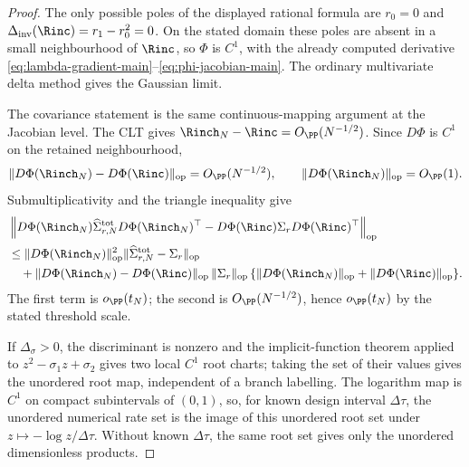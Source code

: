 \begin{proof}
The only possible poles of the displayed rational formula are \(r_0=0\) and
\(\Delta_{\mathrm{inv}}(\Rinc)=r_1-r_0^2=0\).  On the stated domain these poles are absent in a small
neighbourhood of \(\Rinc\), so \(\Phi\) is \(C^1\), with the already computed
derivative \eqref{eq:lambda-gradient-main}--\eqref{eq:phi-jacobian-main}.  The
ordinary multivariate delta method gives the Gaussian limit.

The covariance statement is the same continuous-mapping argument at the
Jacobian level.  The CLT gives \(\Rinch_N-\Rinc=O_{\PP}(N^{-1/2})\).  Since
\(D\Phi\) is \(C^1\) on the retained neighbourhood,
\[
\|D\Phi(\Rinch_N)-D\Phi(\Rinc)\|_{\operatorname{op}}=O_{\PP}(N^{-1/2}),
\qquad
\|D\Phi(\Rinch_N)\|_{\operatorname{op}}=O_{\PP}(1).
\]
Submultiplicativity and the triangle inequality give
\[
\begin{aligned}
&\left\|
D\Phi(\Rinch_N)\widehat\Sigma_{r,N}^{\rm tot}D\Phi(\Rinch_N)^\top
-D\Phi(\Rinc)\Sigma_rD\Phi(\Rinc)^\top
\right\|_{\operatorname{op}}\\
&\le
\|D\Phi(\Rinch_N)\|_{\operatorname{op}}^2
\|\widehat\Sigma_{r,N}^{\rm tot}-\Sigma_r\|_{\operatorname{op}}\\
&\quad+
\|D\Phi(\Rinch_N)-D\Phi(\Rinc)\|_{\operatorname{op}}\,
\|\Sigma_r\|_{\operatorname{op}}\,
\{\|D\Phi(\Rinch_N)\|_{\operatorname{op}}+\|D\Phi(\Rinc)\|_{\operatorname{op}}\}.
\end{aligned}
\]
The first term is \(o_{\PP}(t_N)\); the second is \(O_{\PP}(N^{-1/2})\), hence
\(o_{\PP}(t_N)\) by the stated threshold scale.

If \(\Delta_\sigma>0\), the discriminant is nonzero and the implicit-function
theorem applied to \(z^2-\sigma_1z+\sigma_2\) gives two local \(C^1\) root
charts; taking the set of their values gives the unordered root map, independent
of a branch labelling.  The logarithm map is \(C^1\) on compact subintervals of
\((0,1)\), so, for known design interval \(\Delta\tau\), the unordered
numerical rate set is the image of this unordered root set under
\(z\mapsto-\log z/\Delta\tau\).  Without known \(\Delta\tau\), the same root
set gives only the unordered dimensionless products.

\end{proof}

